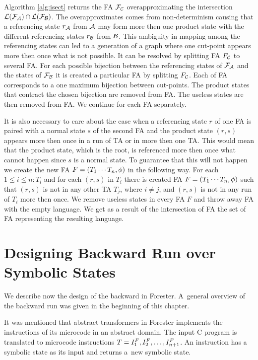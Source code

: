 Algorithm \ref{alg:isect} returns the FA $\mathcal{F}_{\mathcal{C}}$ overapproximating
the intersection $\mathcal{L}(\mathcal{F}_{\mathcal{A}}) \cap \mathcal{L}(\mathcal{F}_{\mathcal{B}})$.
The overapproximates comes from non-determinism causing that a referencing state $r_{\mathcal{A}}$ from $\mathcal{A}$
may form more then one product state with the different referencing states $r_{\mathcal{B}}$ from $\mathcal{B}$.
This ambiguity in mapping among the referencing states
can led to a generation of a graph where one cut-point appears more then once
what is not possible.
It can be resolved by splitting FA $F_{\mathcal{C}}$ to several FA.
For each possible bijection between the referencing states of $\mathcal{F}_{\mathcal{A}}$ and the states of $\mathcal{F}_{\mathcal{B}}$
it is created a particular FA by splitting $F_{\mathcal{C}}$.
Each of FA corresponds to a one maximum bijection between cut-points.
The product states that contract the chosen bijection are
removed from FA.
The useless states are then removed from FA.
We continue for each FA separately.

It is also necessary to care about the case when a referencing state $r$ of one FA
is paired with a normal state $s$ of the second FA and the product state $(r,s)$ appears
more then once in a run of TA or in more then one TA.
This would mean that the product state, which is the root,
is referenced more then once what cannot happen since $s$ is a normal state.
To guarantee that this will not happen we create the new FA $F=(T_1 \cdots T_n, \phi)$
in the following way.
For each $1 \leq i \leq n: T_i$
and for each $(r,s)$ in $T_i$
there is created FA $F=(T_1 \cdots T_n, \phi)$
such that $(r,s)$ is not in any other TA $T_{j}$, where $i \neq j$,
and $(r,s)$ is not in any run of $T_i$ more then once.
We remove useless states in every FA $F$ and throw away FA with the empty language.
We get as a result of the intersection of FA the set of FA representing
the resulting language.

\section{Designing Backward Run over Symbolic States}
\label{sec:brdesign}

We describe now the design of the backward in Forester.
A~general overview of the backward run was given in the beginning of this chapter.

It was mentioned that abstract
transformers in Forester implements the instructions of its microcode in an abstract domain.
The input C program is translated to
microcode instructions $T=I_{1}^{F}, I_{2}^{F},\ldots, I_{n+1}^{F}$.
An instruction has a symbolic state as its input and
returns a~new symbolic state.

